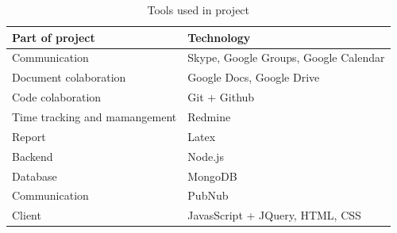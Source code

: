 \begin{table}
\centering
\begin{tabular}{ l l}
\textbf{Part of project}  & \textbf{Technology} \\
\hline
Communication & Skype, Google Groups, Google Calendar \\
Document colaboration & Google Docs, Google Drive \\
Code colaboration & Git + Github \\
Time tracking and mamangement & Redmine \\
Report & Latex \\
Backend & Node.js \\
Database & MongoDB \\
Communication & PubNub \\
Client & JavasScript + JQuery, HTML, CSS \\
\hline
\end{tabular}
\caption{Tools used in project}
\label{table-tools}
\end{table}
